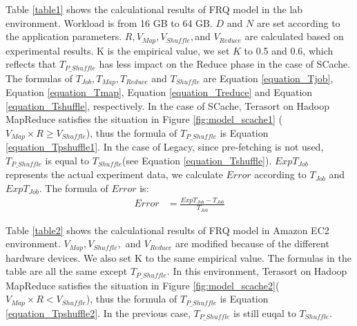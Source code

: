 {Table \ref{table1} shows the calculational results of FRQ model in the lab environment. Workload is from 16 GB to 64 GB. \(D\) and \(N\) are set according to the application parameters. \(R, V_{Map}, V_{Shuffle},\)and \(V_{Reduce}\) are calculated based on experimental results. K is the empirical value, we set \(K\) to 0.5 and 0.6, which reflects that \(T_{P\_Shuffle}\) has less impact on the Reduce phase in the case of SCache. The formulas of \(T_{Job}, T_{Map}, T_{Reduce}\) and \(T_{Shuffle}\) are Equation \ref{equation_Tjob}, Equation \ref{equation_Tmap}, Equation \ref{equation_Treduce} and Equation \ref{equation_Tshuffle}, respectively. In the case of SCache, Terasort on Hadoop MapReduce satisfies the situation in Figure \ref{fig:model_scache1} (\(V_{Map} \times R \ge V_{Shuffle}\)), thus the formula of \(T_{P\_Shuffle}\) is Equation \ref{equation_Tpshuffle1}. In the case of Legacy, since pre-fetching is not used, \(T_{P\_Shuffle}\) is equal to \(T_{Shuffle}\)(see Equation \ref{equation_Tshuffle}). \(ExpT_{Job}\) represents the actual experiment data, we calculate \(Error\) according to \(T_{Job}\) and \(ExpT_{Job}\). The formula of \(Error\) is:
\begin{equation}
	\label{equation_error}
	\begin{aligned}
		Error &= \frac{ExpT_{Job} - T_{Job}}{T_{Job}}
	\end{aligned}
\end{equation}

Table \ref{table2} shows the calculational results of FRQ model in Amazon EC2 environment. \(V_{Map}, V_{Shuffle},\) and \(V_{Reduce}\) are modified because of the different hardware devices. We also set K to the same empirical value. The formulas in the table are all the same except \(T_{P\_Shuffle}\). In this environment, Terasort on Hadoop MapReduce satisfies the situation in Figure \ref{fig:model_scache2}(\(V_{Map} \times R < V_{Shuffle}\)), thus the formula of \(T_{P\_Shuffle}\) is Equation \ref{equation_Tpshuffle2}. In the previous case, \(T_{P\_Shuffle}\) is still euqal to \(T_{Shuffle}\).

}
